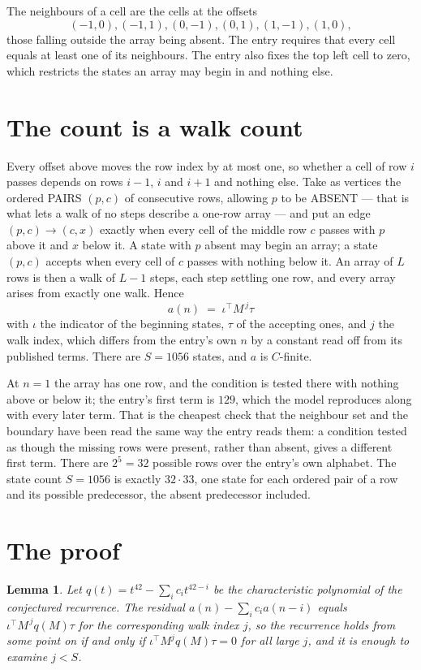 \documentclass[11pt,a4paper]{article}
\theoremstyle{plain}
\newtheorem{lemma}[theorem]{Lemma}
\theoremstyle{definition}
\begin{document}
The neighbours of a cell are the cells at the offsets
\[
(-1,0), (-1,1), (0,-1), (0,1), (1,-1), (1,0),
\]
those falling outside the array being absent. The entry requires that every cell equals at least one of its neighbours. The entry also fixes the top left cell to zero, which restricts the states an array may begin in and nothing else.

\section{The count is a walk count}

Every offset above moves the row index by at most one, so whether a cell of row $i$ passes
depends on rows $i-1$, $i$ and $i+1$ and nothing else. Take as vertices the ordered PAIRS
$(p,c)$ of consecutive rows, allowing $p$ to be ABSENT --- that is what lets a walk of no steps
describe a one-row array --- and put an edge $(p,c)\to(c,x)$ exactly when every cell of the
middle row $c$ passes with $p$ above it and $x$ below it. A state with $p$ absent may begin an
array; a state $(p,c)$ accepts when every cell of $c$ passes with nothing below it. An array of
$L$ rows is then a walk of $L-1$ steps, each step settling one row, and every array arises from
exactly one walk. Hence
\[
a(n)\;=\;\iota^{\!\top}M^{\,j}\tau
\]
with $\iota$ the indicator of the beginning states, $\tau$ of the accepting ones, and $j$ the
walk index, which differs from the entry's own $n$ by a constant read off from its published
terms. There are $S=1056$ states, and $a$ is $C$-finite.

At $n=1$ the array has one row, and
the condition is tested there with nothing above or below it; the entry's first term is
$129$, which the model reproduces along with every later term. That is the cheapest check
that the neighbour set and the boundary have been read the same way the entry reads them: a
condition tested as though the missing rows were present, rather than absent, gives a different
first term. There are $2^{5}=32$ possible rows over the entry's own alphabet. The state count $S=1056$ is exactly $32\cdot33$,
one state for each ordered pair of a row and its possible predecessor, the absent predecessor
included.

\section{The proof}

\begin{lemma}\label{lem:crit}
Let $q(t)=t^{42}-\sum_i c_it^{42-i}$ be the characteristic polynomial of the
conjectured recurrence. The residual $a(n)-\sum_ic_ia(n-i)$ equals
$\iota^{\!\top}M^{\,j}q(M)\tau$ for the corresponding walk index $j$, so the recurrence
holds from some point on if and only if $\iota^{\!\top}M^{j}q(M)\tau=0$ for all large $j$,
and it is enough to examine $j<S$.
\end{lemma}
\end{document}
